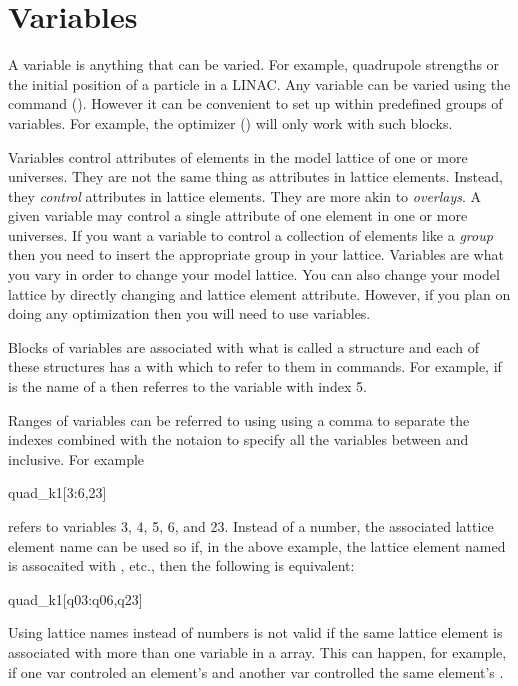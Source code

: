 \section{Variables}
\label{s:variable.overview}


A variable is anything that can be varied. For example, quadrupole
strengths or the initial position of a particle in a LINAC. Any
variable can be varied using the  command
(). However it can be convenient to set up within \tao
predefined groups of variables. For example, the optimizer
() will only work with such blocks.


Variables control attributes of elements in the model lattice of one
or more universes. They are not the same thing as attributes in
lattice elements.  Instead, they \textit{control} attributes in
lattice elements. They are more akin to \bmad \textit{overlays}. A
given variable may control a single attribute of one element in one or
more universes. If you want a variable to control a collection of
elements like a \bmad \textit{group} then you need to insert the
appropriate group in your lattice. Variables are what you vary in
order to change your model lattice. You can also change your model
lattice by directly changing and lattice element attribute. However,
if you plan on doing any optimization then you will need to use
variables.


Blocks of variables are associated with what is called a 
structure and each of these structures has a  with which to
refer to them in \tao commands. For example, if  is the
name of a  then  referres to the variable 
with index 5. 

Ranges of variables can be referred to using using a comma \vn{,} to
separate the indexes combined with the notaion  to specify
all the variables between  and  inclusive. For example
\begin{example}
  quad_k1[3:6,23]
\end{example}
refers to variables 3, 4, 5, 6, and 23. Instead of a number, the
associated lattice element name can be used so if, in the above
example, the lattice element named  is assocaited with
, etc., then the following is equivalent:
\begin{example}
  quad_k1[q03:q06,q23]
\end{example}
Using lattice names instead of numbers is not valid if the same
lattice element is associated with more than one variable in a
 array. This can happen, for example, if one var controled
an element's  and another var controlled the same element's
. 

